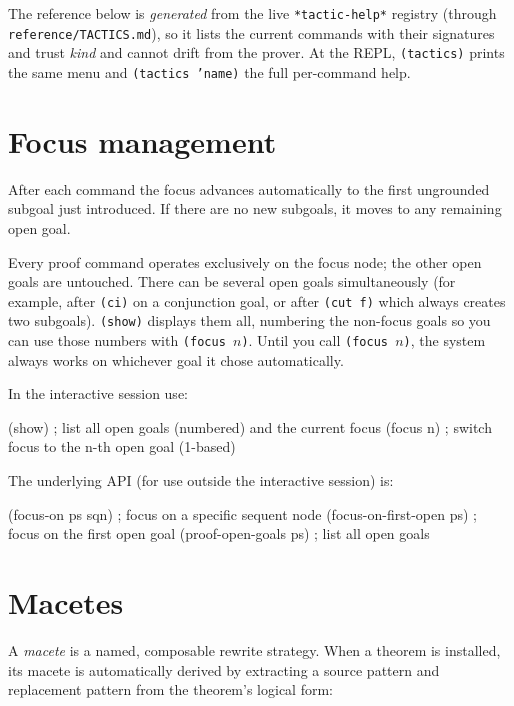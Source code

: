 The reference below is \emph{generated} from the live \texttt{*tactic-help*}
registry (through \texttt{reference/TACTICS.md}), so it lists the current commands
with their signatures and trust \emph{kind} and cannot drift from the prover.  At
the REPL, \texttt{(tactics)} prints the same menu and \texttt{(tactics 'name)} the
full per-command help.



\section{Focus management}

After each command the focus advances automatically to the first
ungrounded subgoal just introduced.  If there are no new subgoals, it
moves to any remaining open goal.

\begin{remark}
Every proof command operates exclusively on the focus node; the other
open goals are untouched.  There can be several open goals simultaneously
(for example, after \texttt{(ci)} on a conjunction goal, or after
\texttt{(cut f)} which always creates two subgoals).  \texttt{(show)}
displays them all, numbering the non-focus goals so you can use those
numbers with \texttt{(focus $n$)}.  Until you call \texttt{(focus $n$)},
the system always works on whichever goal it chose automatically.
\end{remark}

In the interactive session use:
\begin{VNBcode}
(show)       ; list all open goals (numbered) and the current focus
(focus n)    ; switch focus to the n-th open goal (1-based)
\end{VNBcode}

The underlying API (for use outside the interactive session) is:
\begin{VNBcode}
(focus-on ps sqn)            ; focus on a specific sequent node
(focus-on-first-open ps)     ; focus on the first open goal
(proof-open-goals ps)        ; list all open goals
\end{VNBcode}

\section{Macetes}
\label{sec:macetes}

A \emph{macete} is a named, composable rewrite strategy.  When a
theorem is installed, its macete is automatically derived by extracting a
source pattern and replacement pattern from the theorem's logical form:

